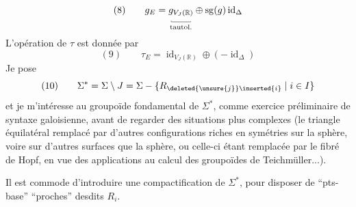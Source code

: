 \[
(8)\qquad g_E=\underset{\text{tautol.}}{\underset{\rule{0.35pt}{0.32ex}\rule{2em}{0.35pt}\rule{0.35pt}{0.18ex}}{g_{V_J(\mathbb R)}}}\oplus\operatorname{sg}(g)\operatorname{id}_\Delta
\]
L'opération de $\tau$ est donnée par
\[
(9)\qquad\tau_E=\operatorname{id}_{V_J(\mathbb R)}\oplus(-\operatorname{id}_\Delta)
\]
Je pose
\[
(10)\qquad\Sigma^*=\Sigma\setminus J=\Sigma-\{R_{\deleted{\unsure{j}}\inserted{i}}\mid i\in I\}
\]
et je m'intéresse au groupoïde fondamental de $\Sigma^*$, comme exercice préliminaire de syntaxe galoisienne, avant de regarder des situations  plus complexes (le triangle équilatéral remplacé par d'autres configurations riches en symétries sur la sphère, voire sur d'autres surfaces que la sphère, ou celle-ci étant remplacée par le fibré de Hopf, en vue des applications au calcul des groupoïdes de Teichmüller...).

Il est commode d'introduire une compactification de $\Sigma^*$, pour disposer  de ``pts-base'' ``proches'' desdits $R_i$.
